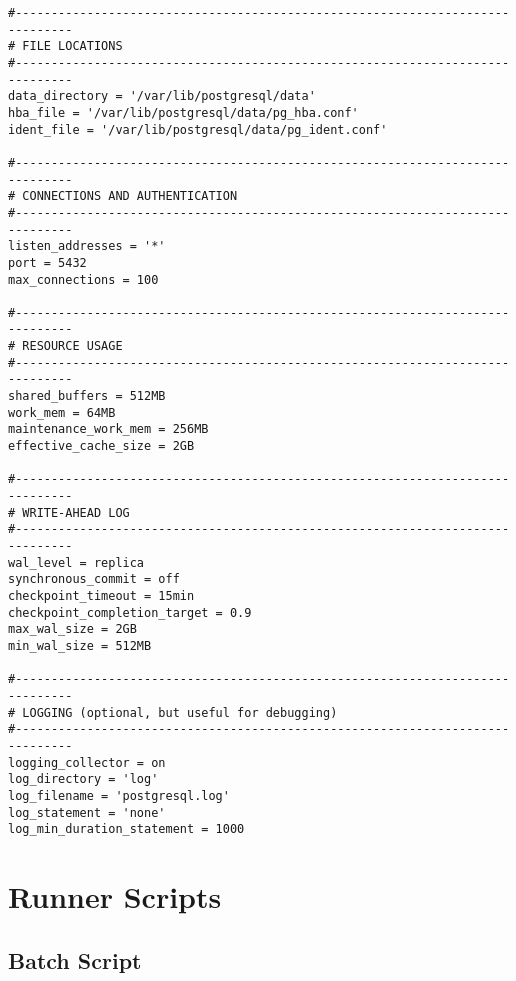 \begin{lstlisting}[caption={PostgreSQL configuration file}, label={lst:postgresql-config}]
#------------------------------------------------------------------------------
# FILE LOCATIONS
#------------------------------------------------------------------------------
data_directory = '/var/lib/postgresql/data'      
hba_file = '/var/lib/postgresql/data/pg_hba.conf'
ident_file = '/var/lib/postgresql/data/pg_ident.conf'

#------------------------------------------------------------------------------
# CONNECTIONS AND AUTHENTICATION
#------------------------------------------------------------------------------
listen_addresses = '*'                
port = 5432                           
max_connections = 100

#------------------------------------------------------------------------------
# RESOURCE USAGE
#------------------------------------------------------------------------------
shared_buffers = 512MB             
work_mem = 64MB                    
maintenance_work_mem = 256MB
effective_cache_size = 2GB         

#------------------------------------------------------------------------------
# WRITE-AHEAD LOG
#------------------------------------------------------------------------------
wal_level = replica
synchronous_commit = off             
checkpoint_timeout = 15min
checkpoint_completion_target = 0.9
max_wal_size = 2GB
min_wal_size = 512MB

#------------------------------------------------------------------------------
# LOGGING (optional, but useful for debugging)
#------------------------------------------------------------------------------
logging_collector = on
log_directory = 'log'
log_filename = 'postgresql.log'
log_statement = 'none'
log_min_duration_statement = 1000   
\end{lstlisting}

\pagebreak

\section{Runner Scripts}
\label{sec:runner-scripts}

\subsection{Batch Script}
\label{sec:batch-script}

